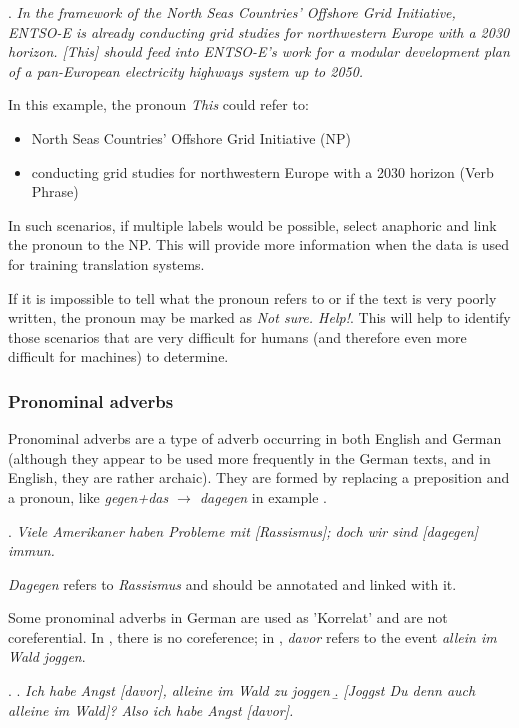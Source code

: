\documentclass[a4paper]{article}
\begin{document}
\ex.
{\sl In the framework of the North Seas Countries’ Offshore Grid Initiative, ENTSO-E is already conducting grid studies for northwestern Europe with a 2030 horizon. [This] should feed into ENTSO-E's work for a modular development plan of a pan-European electricity highways system up to 2050.}

In this example, the pronoun {\sl This} could refer to:
\begin{itemize}
\item North Seas Countries’ Offshore Grid Initiative (NP)
\item conducting grid studies for northwestern Europe with a 2030 horizon (Verb
Phrase)
\end{itemize}

In such scenarios, if multiple labels would be possible, select anaphoric and link the pronoun to the NP. This will provide more information when the data is used for training translation systems.

If it is impossible to tell what the pronoun refers to or if the text is very poorly written, the pronoun may be marked as {\sl Not sure. Help!}. This will help to identify those scenarios that are very difficult for humans (and therefore even more difficult for machines) to determine.

\subsubsection{Pronominal adverbs}\label{sec:pronadv}

Pronominal adverbs are a type of adverb occurring in both English and German
(although they appear to be used more frequently in the German texts, and in English, they are rather archaic). They are formed by replacing a preposition and a pronoun, like {\sl gegen+das $\rightarrow$ dagegen} in example \Next.

\ex. {\sl Viele Amerikaner haben Probleme mit [Rassismus]; doch wir sind [dagegen] immun.}

{\sl Dagegen} refers to {\sl Rassismus} and should be annotated and linked with it.

Some pronominal adverbs in German are used as 'Korrelat' and are not coreferential. In \Next[a], there is no coreference; in \Next[b], {\sl davor} refers to the event {\sl allein im Wald joggen}.

\ex.
\a. {\sl Ich habe Angst [davor], alleine im Wald zu joggen}
\b. {\sl [Joggst Du denn auch alleine im Wald]? Also ich habe Angst [davor].}
\end{document}
